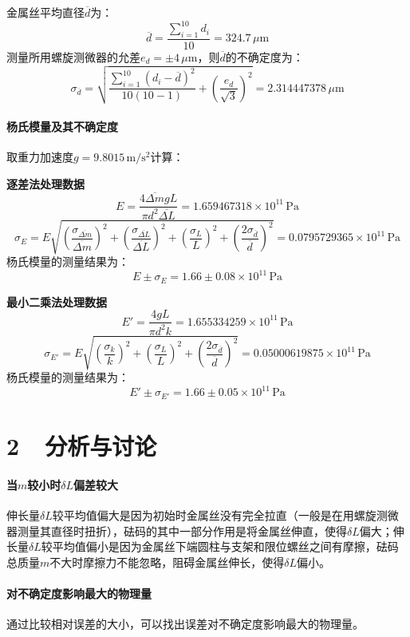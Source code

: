 \documentclass[a4paper,fontset=windows]{ctexart}
\begin{document}
    金属丝平均直径$\overline{d}$为：
    \[
    \overline{d} = \frac{\sum\limits_{i=1}^{10}d_i}{10} = 324.7\,\mu\mathrm{m}
    \]
    测量所用螺旋测微器的允差$e_d = \pm 4\,\mu\mathrm{m}$，则$\overline{d}$的不确定度为：
    \[
    \sigma_{\overline{d}} = \sqrt{\frac{\sum\limits_{i=1}^{10}(d_i - \overline{d})^2}{10(10-1)} + \left(\frac{e_d}{\sqrt{3}}\right)^2} = 2.314447378\,\mu\mathrm{m}
    \]

    \paragraph*{杨氏模量及其不确定度} 取重力加速度$g = 9.8015\,\mathrm{m/s^2}$计算：

    \textbf{逐差法处理数据}
    \[
    E = \frac{4\overline{\Delta m}gL}{\pi d^2\overline{\Delta L}} = 1.659467318\times10^{11}\,\mathrm{Pa}
    \]
    \[
    \sigma_E = E\sqrt{\left(\frac{\sigma_{\overline{\Delta m}}}{\overline{\Delta m}}\right)^2 + \left(\frac{\sigma_{\overline{\Delta L}}}{\overline{\Delta L}}\right)^2 + \left(\frac{\sigma_L}{L}\right)^2 + \left(\frac{2\sigma_{\overline{d}}}{\overline{d}}\right)^2} = 0.0795729365\times10^{11}\,\mathrm{Pa}
    \]
    杨氏模量的测量结果为：
    \[
    E \pm \sigma_E = 1.66 \pm 0.08\times10^{11}\,\mathrm{Pa}
    \]

    \textbf{最小二乘法处理数据}
    \[
    E' = \frac{4gL}{\pi d^2 k} = 1.655334259\times10^{11}\,\mathrm{Pa}
    \]
    \[
    \sigma_{E'} = E\sqrt{\left(\frac{\sigma_k}{k}\right)^2 + \left(\frac{\sigma_L}{L}\right)^2 + \left(\frac{2\sigma_{\overline{d}}}{\overline{d}}\right)^2} = 0.05000619875\times10^{11}\,\mathrm{Pa}
    \]
    杨氏模量的测量结果为：
    \[
    E' \pm \sigma_{E'} = 1.66 \pm 0.05\times10^{11}\,\mathrm{Pa}
    \]

    \section*{2\ \  分析与讨论}

    \paragraph*{当$m$较小时$\delta L$偏差较大} 伸长量$\delta L$较平均值偏大是因为初始时金属丝没有完全拉直（一般是在用螺旋测微器测量其直径时扭折），砝码的其中一部分作用是将金属丝伸直，使得$\delta L$偏大；伸长量$\delta L$较平均值偏小是因为金属丝下端圆柱与支架和限位螺丝之间有摩擦，砝码总质量$m$不大时摩擦力不能忽略，阻碍金属丝伸长，使得$\delta L$偏小。

    \paragraph*{对不确定度影响最大的物理量} 通过比较相对误差的大小，可以找出误差对不确定度影响最大的物理量。
\end{document}
